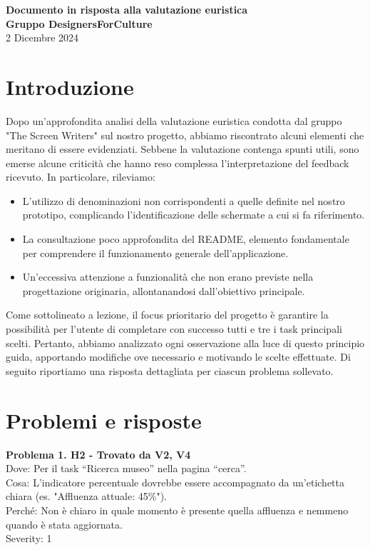 \documentclass{article}
\begin{document}
\begin{center}
    \textbf{\LARGE Documento in risposta alla valutazione euristica} \\[1em]
    \textbf{\large Gruppo DesignersForCulture} \\[1.5em]
    {\large 2 Dicembre 2024}
\end{center}

\section*{Introduzione}

Dopo un'approfondita analisi della valutazione euristica condotta dal gruppo "The Screen Writers" sul nostro progetto, abbiamo riscontrato alcuni elementi che meritano di essere evidenziati. Sebbene la valutazione contenga spunti utili, sono emerse alcune criticità che hanno reso complessa l’interpretazione del feedback ricevuto. In particolare, rileviamo:
\begin{itemize}
    \item L’utilizzo di denominazioni non corrispondenti a quelle definite nel nostro prototipo, complicando l'identificazione delle schermate a cui si fa riferimento.
    \item La consultazione poco approfondita del README, elemento fondamentale per comprendere il funzionamento generale dell’applicazione.
    \item Un'eccessiva attenzione a funzionalità che non erano previste nella progettazione originaria, allontanandosi dall’obiettivo principale.
\end{itemize}

Come sottolineato a lezione, il focus prioritario del progetto è garantire la possibilità per l’utente di completare con successo tutti e tre i task principali scelti. Pertanto, abbiamo analizzato ogni osservazione alla luce di questo principio guida, apportando modifiche ove necessario e motivando le scelte effettuate. Di seguito riportiamo una risposta dettagliata per ciascun problema sollevato.

\section*{Problemi e risposte}

\noindent \textbf{Problema 1. H2 - Trovato da V2, V4} \\
Dove: Per il task “Ricerca museo” nella pagina “cerca”. \\
Cosa: L’indicatore percentuale dovrebbe essere accompagnato da un'etichetta chiara (es. "Affluenza attuale: 45\%"). \\
Perché: Non è chiaro in quale momento è presente quella affluenza e nemmeno quando è stata aggiornata. \\
Severity: 1
\end{document}
